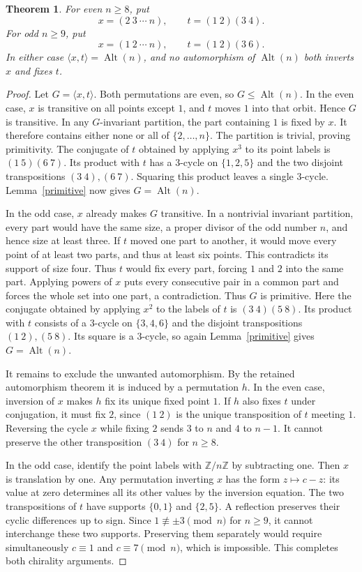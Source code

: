 \documentclass[11pt,a4paper]{article}
\newtheorem{theorem}[lemma]{Theorem}
\newcommand{\Alt}{\operatorname{Alt}}
\begin{document}
\begin{theorem}\label{pairs}
For even $n\geq8$, put
\[
 x=(2\ 3\ \cdots\ n),\qquad t=(1\ 2)(3\ 4).
\]
For odd $n\geq9$, put
\[
 x=(1\ 2\ \cdots\ n),\qquad t=(1\ 2)(3\ 6).
\]
In either case $\langle x,t\rangle=\Alt(n)$, and no automorphism of
$\Alt(n)$ both inverts $x$ and fixes $t$.
\end{theorem}
\begin{proof}
Let $G=\langle x,t\rangle$. Both permutations are even, so $G\leq\Alt(n)$.
In the even case, $x$ is transitive on all points except $1$, and $t$ moves
$1$ into that orbit. Hence $G$ is transitive. In any $G$-invariant partition,
the part containing $1$ is fixed by $x$. It therefore contains either none
or all of $\{2,\ldots,n\}$. The partition is trivial, proving primitivity.
The conjugate of $t$ obtained by applying $x^3$ to its point labels is
$(1\ 5)(6\ 7)$. Its product with $t$ has a $3$-cycle on $\{1,2,5\}$
and the two disjoint transpositions $(3\ 4),(6\ 7)$.
Squaring this product leaves a single $3$-cycle. Lemma~\ref{primitive}
now gives $G=\Alt(n)$.

In the odd case, $x$ already makes $G$ transitive. In a nontrivial invariant
partition, every part would have the same size, a proper divisor of the
odd number $n$, and hence size at least three. If $t$ moved one part to
another, it would move every point of at least two parts, and thus at
least six points. This contradicts its support of size four. Thus $t$
would fix every part, forcing $1$ and $2$ into the same part. Applying
powers of $x$ puts every consecutive pair in a common part and forces
the whole set into one part, a contradiction. Thus $G$ is primitive.
Here the conjugate obtained by applying $x^2$ to the labels of $t$ is
$(3\ 4)(5\ 8)$. Its product with $t$ consists of a $3$-cycle on
$\{3,4,6\}$ and the disjoint transpositions $(1\ 2),(5\ 8)$.
Its square is a $3$-cycle, so again Lemma~\ref{primitive} gives $G=\Alt(n)$.

It remains to exclude the unwanted automorphism. By the retained
automorphism theorem it is induced by a permutation $h$.
In the even case, inversion of $x$ makes $h$ fix its unique fixed point $1$.
If $h$ also fixes $t$ under conjugation, it must fix $2$, since $(1\ 2)$
is the unique transposition of $t$ meeting $1$. Reversing the cycle $x$
while fixing $2$ sends $3$ to $n$ and $4$ to $n-1$.
It cannot preserve the other transposition $(3\ 4)$ for $n\geq8$.

In the odd case, identify the point labels with $\mathbb Z/n\mathbb Z$
by subtracting one. Then $x$ is translation by one. Any permutation
inverting $x$ has the form $z\mapsto c-z$: its value at zero determines
all its other values by the inversion equation. The two transpositions
of $t$ have supports $\{0,1\}$ and $\{2,5\}$.
A reflection preserves their cyclic differences up to sign. Since
$1\not\equiv\pm3\pmod n$ for $n\geq9$, it cannot interchange these two
supports. Preserving them separately would require simultaneously
$c\equiv1$ and $c\equiv7\pmod n$, which is impossible. This completes
both chirality arguments.
\end{proof}
\end{document}

